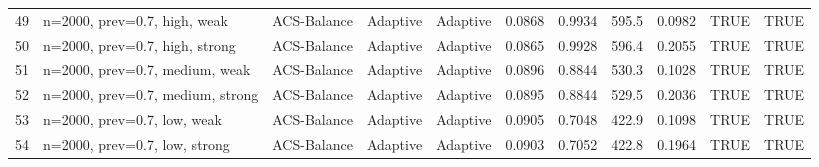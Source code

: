 \begin{tabular}{rllllllllll}
49 & n=2000, prev=0.7, high, weak & ACS-Balance & Adaptive & Adaptive & 0.0868 & 0.9934 & 595.5 & 0.0982 & TRUE & TRUE \\
50 & n=2000, prev=0.7, high, strong & ACS-Balance & Adaptive & Adaptive & 0.0865 & 0.9928 & 596.4 & 0.2055 & TRUE & TRUE \\
51 & n=2000, prev=0.7, medium, weak & ACS-Balance & Adaptive & Adaptive & 0.0896 & 0.8844 & 530.3 & 0.1028 & TRUE & TRUE \\
52 & n=2000, prev=0.7, medium, strong & ACS-Balance & Adaptive & Adaptive & 0.0895 & 0.8844 & 529.5 & 0.2036 & TRUE & TRUE \\
53 & n=2000, prev=0.7, low, weak & ACS-Balance & Adaptive & Adaptive & 0.0905 & 0.7048 & 422.9 & 0.1098 & TRUE & TRUE \\
54 & n=2000, prev=0.7, low, strong & ACS-Balance & Adaptive & Adaptive & 0.0903 & 0.7052 & 422.8 & 0.1964 & TRUE & TRUE \\
\bottomrule
\end{tabular}
